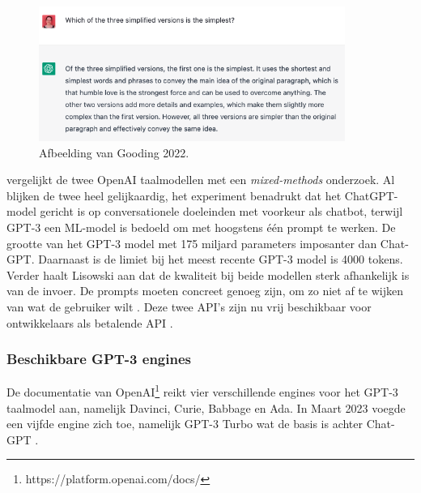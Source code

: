 \begin{figure}[H]
	\includegraphics[width=10cm]{img/chatgpt-example-evaluation-gooding.png}
	\caption{Afbeelding van Gooding 2022.}
\end{figure}

\textcite{Lisowski2023} vergelijkt de twee OpenAI taalmodellen met een \textit{mixed-methods} onderzoek. Al blijken de twee heel gelijkaardig, het experiment benadrukt dat het ChatGPT-model gericht is op conversationele doeleinden met voorkeur als chatbot, terwijl GPT-3 een ML-model is bedoeld om met hoogstens één prompt te werken. De grootte van het GPT-3 model met 175 miljard parameters imposanter dan Chat-GPT. Daarnaast is de limiet bij het meest recente GPT-3 model is 4000 tokens. Verder haalt Lisowski aan dat de kwaliteit bij beide modellen sterk afhankelijk is van de invoer. De prompts moeten concreet genoeg zijn, om zo niet af te wijken van wat de gebruiker wilt \autocite{Lisowski2023}. Deze twee API's zijn nu vrij beschikbaar voor ontwikkelaars als betalende API \autocite{Brockman2023}.

\subsubsection{Beschikbare GPT-3 engines}

De documentatie van OpenAI\footnote{https://platform.openai.com/docs/} reikt vier verschillende engines voor het GPT-3 taalmodel aan, namelijk Davinci, Curie, Babbage en Ada. In Maart 2023 voegde een vijfde engine zich toe, namelijk GPT-3 Turbo wat de basis is achter Chat-GPT \autocite{Brockman2023}.

